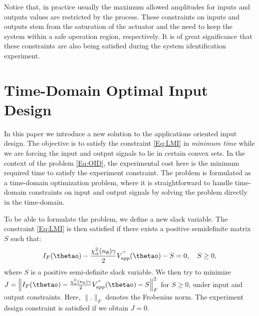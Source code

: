 \documentclass{ifacconf}
\begin{document}
Notice that, in practice usually the maximum allowed amplitudes for inputs and outputs values are restricted by the process. These constraints on inputs and outputs stem from the saturation of the actuator and the need to keep the system within a safe operation region, respectively. It is of great significance that these constraints are also being satisfied during the system identification experiment.

\section{Time-Domain Optimal Input Design}
\label{sec:Time-Domain Optimal Input Design}
In this paper we introduce a new solution to the applications oriented input design. The objective is to satisfy the constraint \eqref{Eq:LMI} in \emph{minimum time} while we are forcing the input and output signals to lie in certain convex sets. In the context of the problem \eqref{Eq:OID}, the experimental cost here is the minimum required time to satisfy the experiment constraint. The problem is formulated as a time-domain optimization problem, where it is straightforward to handle time-domain constraints on input and output signals by solving the problem directly in the time-domain. 

To be able to formulate the problem, we define a new slack variable. The constraint \eqref{Eq:LMI} is then satisfied if there exists a positive semidefinite matrix $S$ such that: 
\begin{equation} \label{Eq:S}
I_F(\thetao) - \frac{\chi^2_\alpha(n_\theta)\gamma}{2}V^{''}_{app}(\thetao) - S = 0, \quad S\geq 0,
\end{equation}
where $S$ is a positive semi-definite slack variable. We then try to minimize $J = {\left \| I_F(\thetao) - \frac{\chi^2_\alpha(n_\theta)\gamma}{2}V^{''}_{app}(\thetao) - S   \right \|}_F^2$ for $S\geq 0$, under input and output constraints. Here, $\|.\|_F$ denotes the Frobenius norm. The experiment design constraint is satisfied if we obtain $J = 0$.
\end{document}
